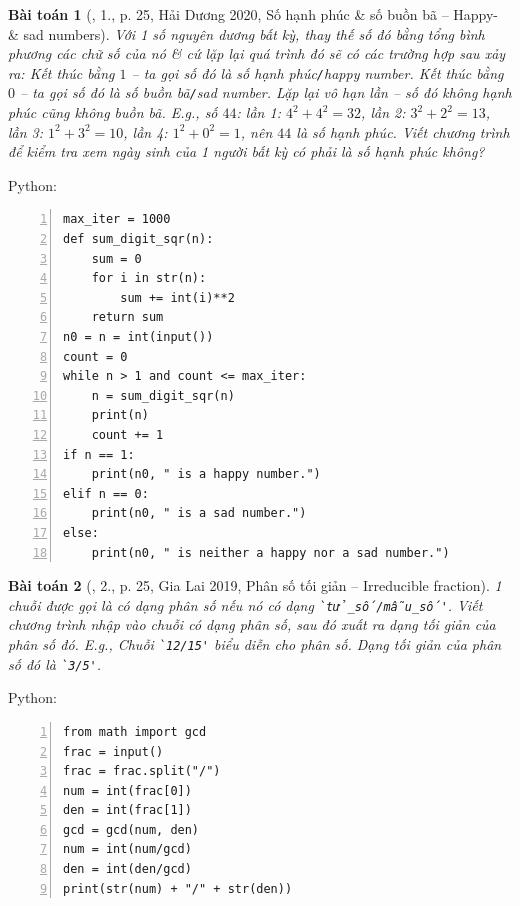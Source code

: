 \documentclass{article}
\newtheorem{baitoan}{Bài toán}
\begin{document}
\begin{baitoan}[\cite{VietSTEM2021}, 1., p. 25, Hải Dương 2020, Số hạnh phúc \& số buồn bã -- Happy- \& sad numbers]
	Với 1 số nguyên dương bất kỳ, thay thế số đó bằng tổng bình phương các chữ số của nó \& cứ lặp lại quá trình đó sẽ có các trường hợp sau xảy ra: Kết thúc bằng $1$ -- ta gọi số đó là \emph{số hạnh phúc{\tt /}happy number}. Kết thúc bằng $0$ -- ta gọi số đó là \emph{số buồn bã{\tt /}sad number}. Lặp lại vô hạn lần -- số đó không hạnh phúc cũng không buồn bã. E.g., số $44$: lần 1: $4^2 + 4^2 = 32$, lần 2: $3^2 + 2^2 = 13$, lần 3: $1^2 + 3^2 = 10$, lần 4: $1^2 + 0^2 = 1$, nên $44$ là số hạnh phúc. Viết chương trình để kiểm tra xem ngày sinh của 1 người bất kỳ có phải là số hạnh phúc không?
\end{baitoan}
Python:
\begin{Verbatim}[numbers=left,xleftmargin=5mm]
max_iter = 1000
def sum_digit_sqr(n):
    sum = 0 
    for i in str(n):
        sum += int(i)**2
    return sum
n0 = n = int(input())
count = 0
while n > 1 and count <= max_iter:
    n = sum_digit_sqr(n)
    print(n)
    count += 1
if n == 1:
    print(n0, " is a happy number.")
elif n == 0:
    print(n0, " is a sad number.")
else:
    print(n0, " is neither a happy nor a sad number.")
\end{Verbatim}

\begin{baitoan}[\cite{VietSTEM2021}, 2., p. 25, Gia Lai 2019, Phân số tối giản -- Irreducible fraction]
	1 chuỗi được gọi là có dạng phân số nếu nó có dạng \verb|`tử_số/mẫu_số'|. Viết chương trình nhập vào chuỗi có dạng phân số, sau đó xuất ra dạng tối giản của phân số đó. E.g., Chuỗi \verb|`12/15'| biểu diễn cho phân số. Dạng tối giản của phân số đó là \verb|`3/5'|.
\end{baitoan}
Python:
\begin{Verbatim}[numbers=left,xleftmargin=5mm]
from math import gcd
frac = input()
frac = frac.split("/")
num = int(frac[0])
den = int(frac[1])
gcd = gcd(num, den)
num = int(num/gcd)
den = int(den/gcd)
print(str(num) + "/" + str(den))
\end{Verbatim}
\end{document}
